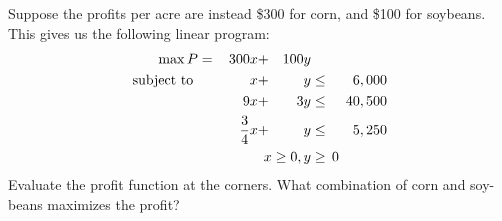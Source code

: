 \documentclass[../mathNotesPreamble]{subfiles}
\begin{document}
  \begin{ex*}
    Suppose the profits per acre are instead \$300 for corn, and \$100 for soybeans. This gives us the following linear program:
      \begin{alignat*}{4}
        \max P&=&\,300x&+&100y\\
        \textnormal{subject to }&& x&+&y&\leq& 6,000\\
          &&9x&+&3y&\leq &\,40,500\\
          &&\frac{3}{4}x&+&y&\leq& 5,250\\
          &&&&\mathllap{x\geq 0}, y&\geq\mathrlap{\,0}& 
      \end{alignat*}
    Evaluate the profit function at the corners. What combination of corn and soy-beans maximizes the profit?
  \end{ex*}
  
\end{document}
